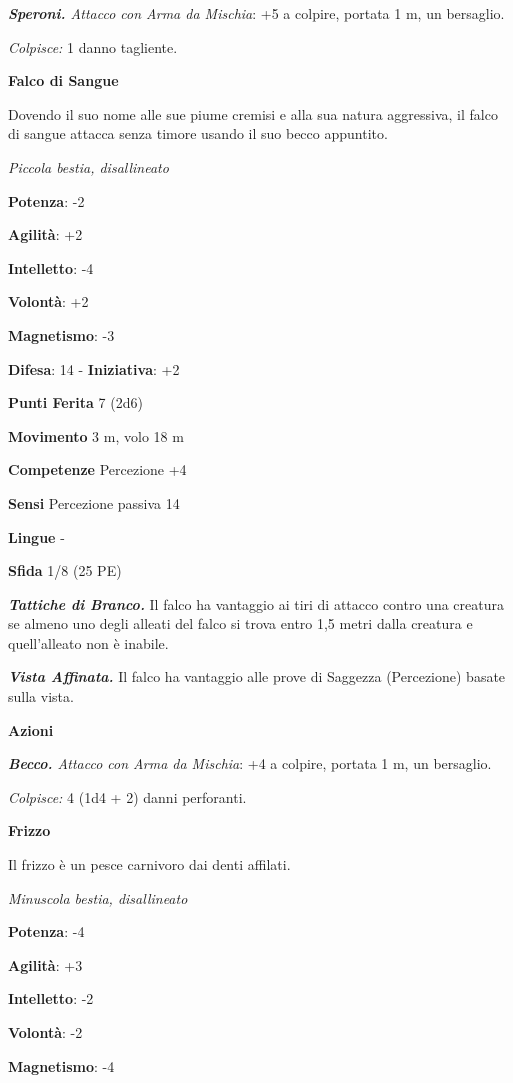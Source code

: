 \begin{multicols}{2}
\emph{\textbf{Speroni.} Attacco con Arma da Mischia}: +5 a colpire,
portata 1 m, un bersaglio.

\emph{Colpisce:} 1 danno tagliente.

\textbf{Falco di Sangue}

Dovendo il suo nome alle sue piume cremisi e alla sua natura aggressiva,
il falco di sangue attacca senza timore usando il suo becco appuntito.

\emph{Piccola bestia, disallineato}

\textbf{Potenza}: -2

\textbf{Agilità}: +2

\textbf{Intelletto}: -4

\textbf{Volontà}: +2

\textbf{Magnetismo}: -3

\textbf{Difesa}: 14 - \textbf{Iniziativa}: +2

\textbf{Punti Ferita} 7 (2d6)

\textbf{Movimento} 3 m, volo 18 m

\textbf{Competenze} Percezione +4

\textbf{Sensi} Percezione passiva 14

\textbf{Lingue} -

\textbf{Sfida} 1/8 (25 PE)\smallskip

\emph{\textbf{Tattiche di Branco.}} Il falco ha vantaggio ai tiri di
attacco contro una creatura se almeno uno degli alleati del falco si
trova entro 1,5 metri dalla creatura e quell'alleato non è inabile.

\emph{\textbf{Vista Affinata.}} Il falco ha vantaggio alle prove di
Saggezza (Percezione) basate sulla vista.

\smallskip\textbf{Azioni}

\emph{\textbf{Becco.} Attacco con Arma da Mischia}: +4 a colpire,
portata 1 m, un bersaglio.

\emph{Colpisce:} 4 (1d4 + 2) danni perforanti.



\textbf{Frizzo}

Il frizzo è un pesce carnivoro dai denti affilati.

\emph{Minuscola bestia, disallineato}

\textbf{Potenza}: -4

\textbf{Agilità}: +3

\textbf{Intelletto}: -2

\textbf{Volontà}: -2

\textbf{Magnetismo}: -4


\end{multicols}

